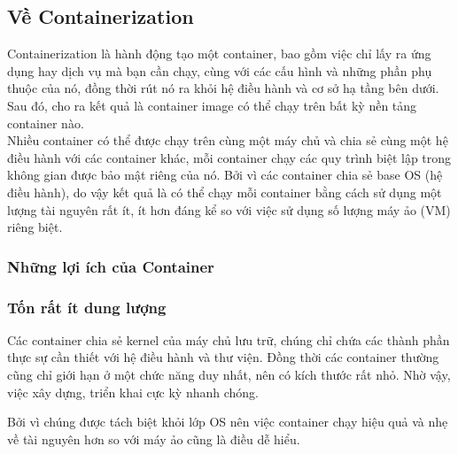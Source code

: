 \documentclass[12pt,a4paper]{report}
\begin{document}
		\subsection{Về Containerization}
		\hspace{0.6cm}Containerization là hành động tạo một container, bao gồm việc chỉ lấy ra ứng dụng hay dịch vụ mà bạn cần chạy, cùng với các cấu hình và những phần phụ thuộc của nó, đồng thời rút nó ra khỏi hệ điều hành và cơ sở hạ tầng bên dưới. Sau đó, cho ra kết quả là container image có thể chạy trên bất kỳ nền tảng container nào.\\
		
		Nhiều container có thể được chạy trên cùng một máy chủ và chia sẻ cùng một hệ điều hành với các container khác, mỗi container chạy các quy trình biệt lập trong không gian được bảo mật riêng của nó. Bởi vì các container chia sẻ base OS (hệ điều hành), do vậy kết quả là có thể chạy mỗi container bằng cách sử dụng một lượng tài nguyên rất ít, ít hơn đáng kể so với việc sử dụng số lượng máy ảo (VM) riêng biệt.
			\subsubsection{Những lợi ích của Container}
			\subsubsection{Tốn rất ít dung lượng}
		\hspace{0.6cm}Các container chia sẻ kernel của máy chủ lưu trữ, chúng chỉ chứa các thành phần thực sự cần thiết với hệ điều hành và thư viện. Đồng thời các container thường cũng chỉ giới hạn ở một chức năng duy nhất, nên có kích thước rất nhỏ. Nhờ vậy, việc xây dựng, triển khai cực kỳ nhanh chóng.
		
		Bởi vì chúng được tách biệt khỏi lớp OS nên việc container chạy hiệu quả và nhẹ về tài nguyên hơn so với máy ảo cũng là điều dễ hiểu.
\end{document}
